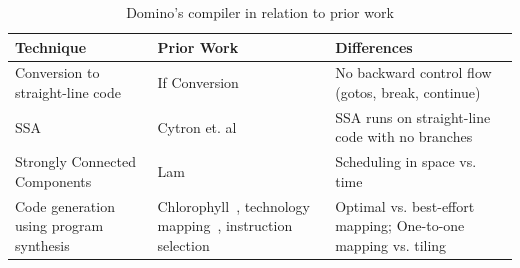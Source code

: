 

\begin{table}[!t]
  \begin{scriptsize}
    \begin{tabular}{|p{}|p{}|p{}|}
  \hline
  Technique & Prior Work & Differences \\
  \hline
  Conversion to straight-line code & If Conversion~\cite{if_conversion} & No backward control flow (gotos, break, continue) \\
  \hline
  SSA & Cytron et. al~\cite{ssa} & SSA runs on straight-line code with no branches \\
  \hline
  Strongly Connected Components & Lam~\cite{software_pipelining} & Scheduling in space vs. time \\ %
  \hline
  Code generation using program synthesis & Chlorophyll~\cite{chlorophyll}, technology mapping~\cite{micheli, flowmap, spectransform}, instruction selection~\cite{muchnik} & Optimal vs. best-effort mapping; One-to-one mapping vs. tiling \\
  \hline
  \end{tabular}
  \end{scriptsize}
  \caption{Domino's compiler in relation to prior work}
  \label{tab:prior_compiler}
\end{table}

